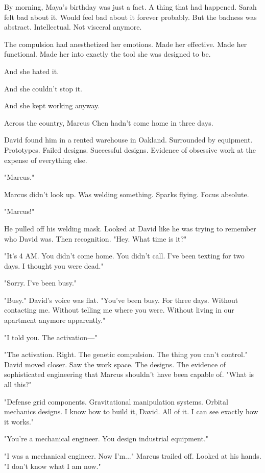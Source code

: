 By morning, Maya's birthday was just a fact. A thing that had happened. Sarah felt bad about it. Would feel bad about it forever probably. But the badness was abstract. Intellectual. Not visceral anymore.

The compulsion had anesthetized her emotions. Made her effective. Made her functional. Made her into exactly the tool she was designed to be.

And she hated it.

And she couldn't stop it.

And she kept working anyway.

\scenebreak

Across the country, Marcus Chen hadn't come home in three days.

David found him in a rented warehouse in Oakland. Surrounded by equipment. Prototypes. Failed designs. Successful designs. Evidence of obsessive work at the expense of everything else.

"Marcus."

Marcus didn't look up. Was welding something. Sparks flying. Focus absolute.

"Marcus!"

He pulled off his welding mask. Looked at David like he was trying to remember who David was. Then recognition. "Hey. What time is it?"

"It's 4 AM. You didn't come home. You didn't call. I've been texting for two days. I thought you were dead."

"Sorry. I've been busy."

"Busy." David's voice was flat. "You've been busy. For three days. Without contacting me. Without telling me where you were. Without living in our apartment anymore apparently."

"I told you. The activation—"

"The activation. Right. The genetic compulsion. The thing you can't control." David moved closer. Saw the work space. The designs. The evidence of sophisticated engineering that Marcus shouldn't have been capable of. "What is all this?"

"Defense grid components. Gravitational manipulation systems. Orbital mechanics designs. I know how to build it, David. All of it. I can see exactly how it works."

"You're a mechanical engineer. You design industrial equipment."

"I was a mechanical engineer. Now I'm..." Marcus trailed off. Looked at his hands. "I don't know what I am now."

